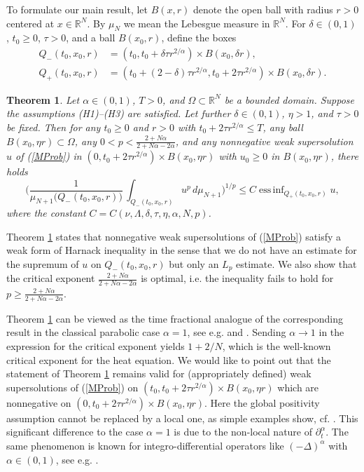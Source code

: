 \documentclass[10pt]{article}
\newtheorem{satz}{Theorem}[section]
\newcommand{\iR}{\mathbb{R}}
\DeclareMathOperator*{\einf}{ess\,inf}
\begin{document}
To formulate our main result, let $B(x,r)$ denote the open ball with
radius $r>0$ centered at $x\in \iR^N$. By $\mu_N$ we mean the
Lebesgue measure in $\iR^N$. For $\delta\in(0,1)$, $t_0\ge 0$,
$\tau>0$, and a ball $B(x_0,r)$, define the boxes
\begin{align*}
Q_-(t_0,x_0,r)&=(t_0,t_0+\delta\tau r^{2/\alpha})\times B(x_0,\delta r),\\
Q_+(t_0,x_0,r)&=(t_0+(2-\delta)\tau r^{2/\alpha},t_0+2\tau
r^{2/\alpha})\times B(x_0,\delta r).
\end{align*}
\begin{satz} \label{localweakHarnack}
Let $\alpha\in(0,1)$, $T>0$, and $\Omega\subset \iR^N$ be a
bounded domain. Suppose the assumptions (H1)--(H3) are satisfied.
Let further $\delta\in(0,1)$, $\eta>1$, and $\tau>0$ be fixed.
Then for any $t_0\ge 0$ and $r>0$ with $t_0+2\tau r^{2/\alpha}\le
T$, any ball $B(x_0,\eta r)\subset\Omega$, any
$0<p<\frac{2+N\alpha}{2+N\alpha-2\alpha}$, and any nonnegative
weak supersolution $u$ of (\ref{MProb}) in $(0,t_0+2\tau
r^{2/\alpha})\times B(x_0,\eta r)$ with $u_0\ge 0$ in $B(x_0,\eta
r)$, there holds
\begin{equation} \label{localwHarnackF}
\Big(\frac{1}{\mu_{N+1}\big(Q_-(t_0,x_0,r)\big)}\,\int_{Q_-(t_0,x_0,r)}u^p\,d\mu_{N+1}\Big)^{1/p}
\le C \einf_{Q_+(t_0,x_0,r)} u,
\end{equation}
where the constant $C=C(\nu,\Lambda,\delta,\tau,\eta,\alpha,N,p)$.
\end{satz}
Theorem \ref{localweakHarnack} states that nonnegative weak
supersolutions of (\ref{MProb}) satisfy a weak form of Harnack
inequality in the sense that we do not have an estimate for the
supremum of $u$ on $Q_-(t_0,x_0,r)$ but only an $L_p$ estimate. We
also show that the critical exponent
$\frac{2+N\alpha}{2+N\alpha-2\alpha}$ is optimal, i.e. the
inequality fails to hold for $p\ge
\frac{2+N\alpha}{2+N\alpha-2\alpha}$.

Theorem \ref{localweakHarnack} can be viewed as the time fractional
analogue of the corresponding result in the classical parabolic case
$\alpha=1$, see e.g. \cite[Theorem 6.18]{Lm} and \cite{Trud}.
Sending $\alpha\to 1$ in the expression for the critical exponent
yields $1+2/N$, which is the well-known critical exponent for the
heat equation. We would like to point out that the statement of
Theorem \ref{localweakHarnack} remains valid for (appropriately
defined) weak supersolutions of (\ref{MProb}) on $(t_0,t_0+2\tau
r^{2/\alpha})\times B(x_0,\eta r)$ which are nonnegative on
$(0,t_0+2\tau r^{2/\alpha})\times B(x_0,\eta r)$. Here the global
positivity assumption cannot be replaced by a local one, as simple
examples show, cf. \cite{Za3}. This significant difference to the
case $\alpha=1$ is due to the non-local nature of
$\partial_t^\alpha$. The same phenomenon is known for
integro-differential operators like $(-\Delta)^\alpha$ with
$\alpha\in (0,1)$, see e.g. \cite{Kass1}.
\end{document}
